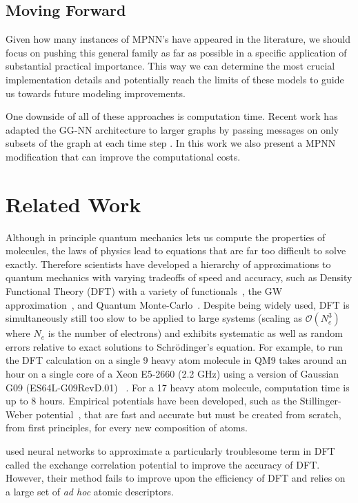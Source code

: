 \documentclass{article}
\begin{document}
        
\subsection{ Moving Forward}
Given how many instances of MPNN’s have appeared in the literature, we should focus on pushing this general family as far as possible in a specific application of substantial practical importance. This way we can determine the most crucial implementation details and potentially reach the limits of these models to guide us towards future modeling improvements.

One downside of all of these approaches is computation time. Recent work has adapted the GG-NN architecture to larger graphs by passing messages on only subsets of the graph at each time step \citep{marino2016more}. In this work we also present a MPNN modification that can improve the computational costs.


\section{Related Work}



Although in principle quantum mechanics lets us compute the properties of molecules, the laws of physics lead to equations that are far too difficult to solve exactly. Therefore scientists have developed a hierarchy of approximations to quantum mechanics with varying tradeoffs of speed and accuracy, such as Density Functional Theory (DFT) with a variety of functionals~\citep{becke93, hohenberg64}, the GW approximation~\citep{hedin65}, and Quantum Monte-Carlo~\citep{ceperley86}. Despite being widely used, DFT is simultaneously still too slow to be applied to large systems (scaling as $\mathcal O(N_e^3)$ where $N_e$ is the number of electrons) and exhibits systematic as well as random errors relative to exact solutions to Schr\"odinger's equation. For example, to run the DFT calculation on a single 9 heavy atom molecule in QM9 takes around an hour on a single core of a Xeon E5-2660 (2.2 GHz) using  a version of Gaussian G09 (ES64L-G09RevD.01) ~\citep{bing2016pc}. For a 17 heavy atom molecule, computation time is up to 8 hours. Empirical potentials have been developed, such as the Stillinger-Weber potential~\citep{stillinger85}, that are fast and accurate but must be created from scratch, from first principles, for every new composition of atoms.

\citet{hu2003} used neural networks to approximate a particularly troublesome term in DFT called the exchange correlation potential to improve the accuracy of DFT. However, their method fails to improve upon the efficiency of DFT and relies on a large set of \textit{ad hoc} atomic descriptors.
\end{document}
